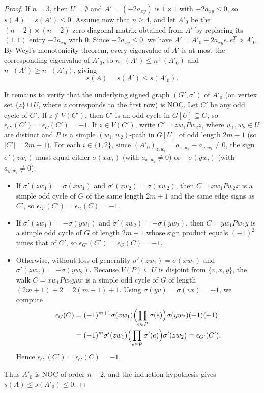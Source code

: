 \documentclass[10pt,letterpaper]{article}
\theoremstyle{zetaplain}
\theoremstyle{zetadef}
\theoremstyle{remark}
\numberwithin{equation}{section}
\begin{document}
\begin{proof}
If $n = 3$, then $U = \emptyset$ and $A' = (-2a_{xy})$ is $1 \times 1$ with $-2a_{xy} \le 0$, so $s(A) = s(A') \le 0$. Assume now that $n \ge 4$, and let $A'_0$ be the $(n - 2) \times (n - 2)$ zero-diagonal matrix obtained from $A'$ by replacing its $(1, 1)$ entry $-2a_{xy}$ with $0$. Since $-2a_{xy} \le 0$, we have $A' = A'_0 - 2a_{xy} e_1 e_1^T \preceq A'_0$. By Weyl's monotonicity theorem, every eigenvalue of $A'$ is at most the corresponding eigenvalue of $A'_0$, so $n^+(A') \le n^+(A'_0)$ and $n^-(A') \ge n^-(A'_0)$, giving
\[
  s(A) = s(A') \le s(A'_0).
\]

It remains to verify that the underlying signed graph $(G', \sigma')$ of $A'_0$ (on vertex set $\{z\} \cup U$, where $z$ corresponds to the first row) is NOC. Let $C'$ be any odd cycle of $G'$. If $z \notin V(C')$, then $C'$ is an odd cycle in $G[U] \subseteq G$, so $\epsilon_{G'}(C') = \epsilon_G(C') = -1$. If $z \in V(C')$, write $C' = z w_1 P w_2 z$, where $w_1, w_2 \in U$ are distinct and $P$ is a simple $(w_1, w_2)$-path in $G[U]$ of odd length $2m - 1$ (so $|C'| = 2m + 1$). For each $i \in \{1, 2\}$, since $(A'_0)_{z, w_i} = a_{x, w_i} - a_{y, w_i} \ne 0$, the sign $\sigma'(z w_i)$ must equal either $\sigma(x w_i)$ (with $a_{x, w_i} \ne 0$) or $-\sigma(y w_i)$ (with $a_{y, w_i} \ne 0$).
\begin{itemize}
  \item If $\sigma'(z w_1) = \sigma(x w_1)$ and $\sigma'(z w_2) = \sigma(x w_2)$, then $C = x w_1 P w_2 x$ is a simple odd cycle of $G$ of the same length $2m + 1$ and the same edge signs as $C'$, so $\epsilon_{G'}(C') = \epsilon_G(C) = -1$.
  \item If $\sigma'(z w_1) = -\sigma(y w_1)$ and $\sigma'(z w_2) = -\sigma(y w_2)$, then $C = y w_1 P w_2 y$ is a simple odd cycle of $G$ of length $2m + 1$ whose sign product equals $(-1)^2$ times that of $C'$, so $\epsilon_{G'}(C') = \epsilon_G(C) = -1$.
  \item Otherwise, without loss of generality $\sigma'(z w_1) = \sigma(x w_1)$ and $\sigma'(z w_2) = -\sigma(y w_2)$. Because $V(P) \subseteq U$ is disjoint from $\{v, x, y\}$, the walk $C = x w_1 P w_2 y v x$ is a simple odd cycle of $G$ of length $(2m + 1) + 2 = 2(m + 1) + 1$. Using $\sigma(yv) = \sigma(vx) = +1$, we compute
  \begin{align*}
    \epsilon_G(C)
    &= (-1)^{m+1} \sigma(x w_1) \Bigl(\prod_{e \in P} \sigma(e)\Bigr) \sigma(y w_2)(+1)(+1) \\
    &= (-1)^m \sigma'(z w_1) \Bigl(\prod_{e \in P} \sigma'(e)\Bigr) \sigma'(z w_2) = \epsilon_{G'}(C').
  \end{align*}
  Hence $\epsilon_{G'}(C') = \epsilon_G(C) = -1$.
\end{itemize}
Thus $A'_0$ is NOC of order $n - 2$, and the induction hypothesis gives $s(A) \le s(A'_0) \le 0$.
\end{proof}
\end{document}
